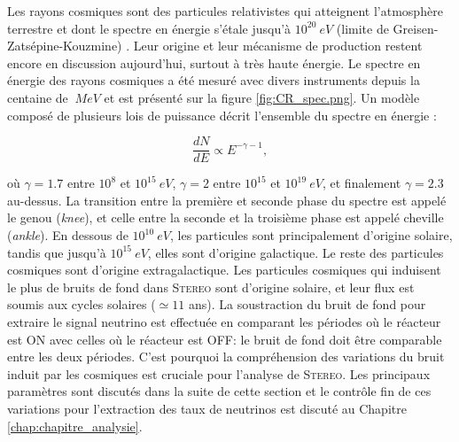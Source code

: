 Les rayons cosmiques sont des particules relativistes qui atteignent l'atmosphère terrestre et dont le spectre en énergie s'étale jusqu'à $10^{20}\SI{}{eV}$ (limite de Greisen-Zatsépine-Kouzmine) \cite{Greisen:1966jv}. Leur origine et leur mécanisme de production restent encore en discussion aujourd'hui, surtout à très haute énergie. Le spectre en énergie des rayons cosmiques a été mesuré avec divers instruments depuis la centaine de $\SI{}{MeV}$ et est présenté sur la figure \ref{fig:CR_spec.png}. Un modèle composé de plusieurs lois de puissance décrit l'ensemble du spectre en énergie :

\begin{equation}
\label{eq:cosmic_power_law}
    \frac{dN}{dE} \propto E^{-\gamma - 1},
\end{equation}

\bigbreak

où $\gamma = 1.7$ entre $10^8$ et $10^{15}\SI{}{eV}$, $\gamma = 2$ entre $10^{15}$ et $10^{19}\SI{}{eV}$, et finalement $\gamma = 2.3$ au-dessus. La transition entre la première et seconde phase du spectre est appelé le genou (\textit{knee}), et celle entre la seconde et la troisième phase est appelé cheville (\textit{ankle}). En dessous de $10^{10}\SI{}{eV}$, les particules sont principalement d'origine solaire, tandis que jusqu'à $10^{15}\SI{}{eV}$, elles sont d'origine galactique. Le reste des particules cosmiques sont d'origine extragalactique. Les particules cosmiques qui induisent le plus de bruits de fond dans \textsc{Stereo} sont d'origine solaire, et leur flux est soumis aux cycles solaires ($\simeq 11$ ans). La soustraction du bruit de fond pour extraire le signal neutrino est effectuée en comparant les périodes où le réacteur est ON avec celles où le réacteur est OFF: le bruit de fond doit être comparable entre les deux périodes. C'est pourquoi la compréhension des variations du bruit induit par les cosmiques est cruciale pour l'analyse de \textsc{Stereo}. Les principaux paramètres sont discutés dans la suite de cette section et le contrôle fin de ces variations pour l'extraction des taux de neutrinos est discuté au Chapitre \ref{chap:chapitre_analysie}.\\


